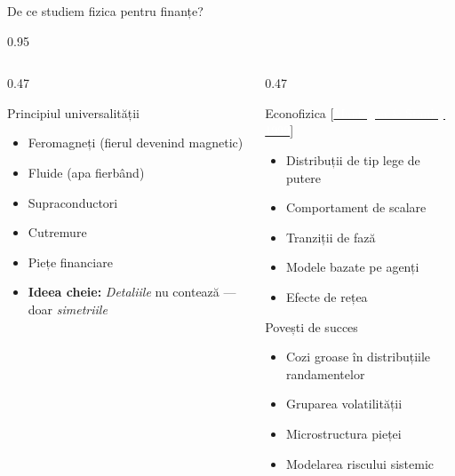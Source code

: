 \documentclass[9pt, aspectratio=169, t]{beamer}
\begin{document}
\begin{frame}{De ce studiem fizica pentru finanțe?}
    \begin{cminipage}{0.95\textwidth}
    {\footnotesize
    \begin{columns}[T]
        \begin{column}{0.47\textwidth}
            \begin{block}{Principiul universalității}
                \begin{itemize}\setlength{\itemsep}{0pt}
                    \item Feromagneți (fierul devenind magnetic)
                    \item Fluide (apa fierbând)
                    \item Supraconductori
                    \item Cutremure
                    \item Piețe financiare
                    \item \textbf{Ideea cheie:} \textit{Detaliile} nu contează --- doar \textit{simetriile}
                \end{itemize}
            \end{block}
        \end{column}
        \begin{column}{0.47\textwidth}
            \begin{alertblock}{Econofizica {\scriptsize[\href{https://doi.org/10.1017/CBO9780511755767}{\textcolor{white}{Mantegna \& Stanley, 1999}}]}}
                \begin{itemize}\setlength{\itemsep}{0pt}
                    \item Distribuții de tip lege de putere
                    \item Comportament de scalare
                    \item Tranziții de fază
                    \item Modele bazate pe agenți
                    \item Efecte de rețea
                \end{itemize}
            \end{alertblock}

            \begin{exampleblock}{Povești de succes}
                \begin{itemize}\setlength{\itemsep}{0pt}
                    \item Cozi groase în distribuțiile randamentelor
                    \item Gruparea volatilității
                    \item Microstructura pieței
                    \item Modelarea riscului sistemic
                \end{itemize}
            \end{exampleblock}
        \end{column}
    \end{columns}
    }
    \end{cminipage}
\end{frame}
\end{document}
